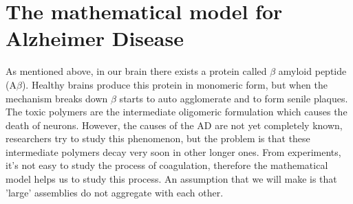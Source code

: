 \section{The mathematical model for Alzheimer Disease}
As mentioned above, in our brain there exists a protein called \(\beta\) amyloid peptide ($\mathrm{A} \beta$). Healthy brains produce this protein in monomeric form, but when the mechanism breaks down \(\beta\) starts to auto agglomerate and to form senile plaques. The toxic polymers are the intermediate oligomeric formulation which causes the death of neurons. However, the causes of the AD are not yet completely known, researchers try to study this phenomenon, but the problem is that these intermediate polymers decay very soon in other longer ones. From experiments, it's not easy to study the process of coagulation, therefore the mathematical model helps us to study this process. An assumption that we will make is that 'large' assemblies do not aggregate with each other.
